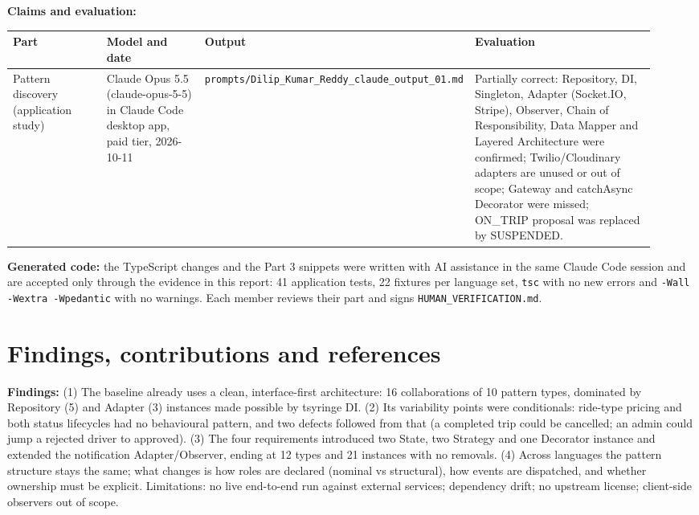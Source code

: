 \documentclass[11pt,a4paper]{article}
\begin{document}
\textbf{Claims and evaluation:}\\
\begin{tabular}{@{}P{0.17\linewidth}P{0.2\linewidth}P{0.2\linewidth}P{0.36\linewidth}@{}}\toprule Part & Model and date & Output & Evaluation\\\midrule
Pattern discovery (application study) & Claude Opus 5.5 (claude-opus-5-5) in Claude Code desktop app, paid tier, 2026-10-11 & \texttt{prompts/\allowbreak{}Dilip\_\allowbreak{}Kumar\_\allowbreak{}Reddy\_\allowbreak{}claude\_\allowbreak{}output\_\allowbreak{}01.\allowbreak{}md} & Partially correct: Repository, DI, Singleton, Adapter (Socket.IO, Stripe), Observer, Chain of Responsibility, Data Mapper and Layered Architecture were confirmed; Twilio/Cloudinary adapters are unused or out of scope; Gateway and catchAsync Decorator were missed; ON\_TRIP proposal was replaced by SUSPENDED. \\
\bottomrule\end{tabular}

\textbf{Generated code:} the TypeScript changes and the Part 3 snippets were written with AI assistance in the same Claude Code session and are
accepted only through the evidence in this report: 41 application tests, 22 fixtures per language set, \texttt{tsc} with no new errors and
\texttt{-Wall -Wextra -Wpedantic} with no warnings. Each member reviews their part and signs \texttt{HUMAN\_VERIFICATION.md}.

\section{Findings, contributions and references}
\textbf{Findings:} (1) The baseline already uses a clean, interface-first architecture: 16 collaborations of 10 pattern types, dominated by
Repository (5) and Adapter (3) instances made possible by tsyringe DI. (2) Its variability points were conditionals: ride-type pricing and
both status lifecycles had no behavioural pattern, and two defects followed from that (a completed trip could be cancelled; an admin could
jump a rejected driver to approved). (3) The four requirements introduced two State, two Strategy and one Decorator instance and extended
the notification Adapter/Observer, ending at 12 types and 21 instances with no removals. (4) Across languages the pattern structure stays the
same; what changes is how roles are declared (nominal vs structural), how events are dispatched, and whether ownership must be explicit.
Limitations: no live end-to-end run against external services; dependency drift; no upstream license; client-side observers out of scope.
\end{document}
